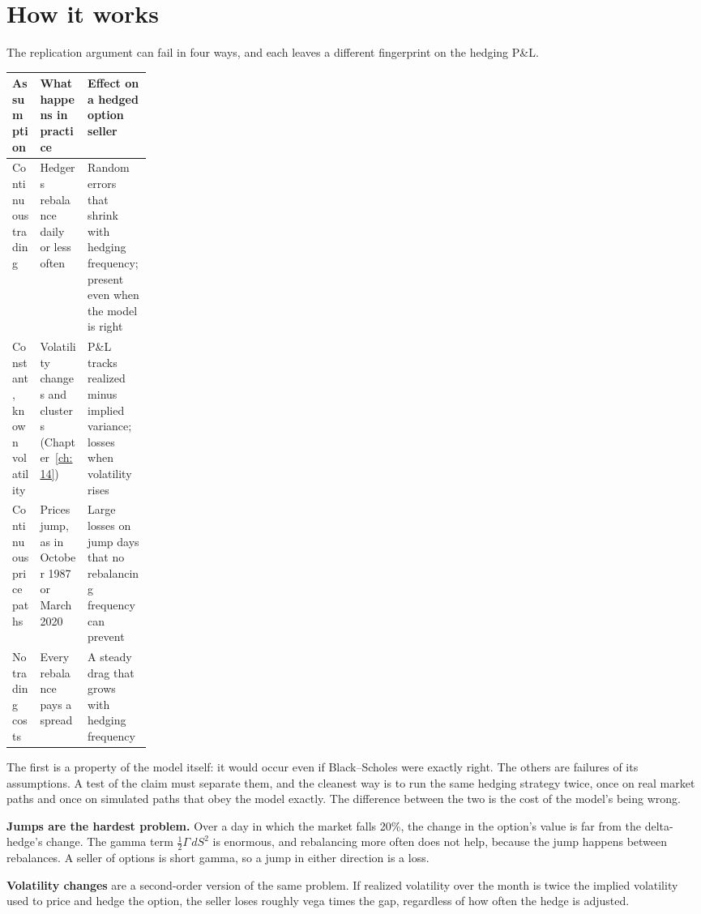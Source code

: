 \section{How it works}
\label{sec:17-how}

The replication argument can fail in four ways, and each leaves a different fingerprint on the hedging P\&L.

\begin{center}
\small
\begin{tabularx}{0.9\linewidth}{@{}>{\raggedright\arraybackslash}p{0.2\linewidth}>{\raggedright\arraybackslash}X>{\raggedright\arraybackslash}X@{}}
\toprule
Assumption & What happens in practice & Effect on a hedged option seller \\
\midrule
Continuous trading & Hedgers rebalance daily or less often & Random errors that shrink with hedging frequency; present even when the model is right \\
Constant, known volatility & Volatility changes and clusters (Chapter~\ref{ch:14}) & P\&L tracks realized minus implied variance; losses when volatility rises \\
Continuous price paths & Prices jump, as in October 1987 or March 2020 & Large losses on jump days that no rebalancing frequency can prevent \\
No trading costs & Every rebalance pays a spread & A steady drag that grows with hedging frequency \\
\bottomrule
\end{tabularx}
\end{center}

The first is a property of the model itself: it would occur even if Black--Scholes were exactly right. The others are failures of its assumptions. A test of the claim must separate them, and the cleanest way is to run the same hedging strategy twice, once on real market paths and once on simulated paths that obey the model exactly. The difference between the two is the cost of the model's being wrong.

\textbf{Jumps are the hardest problem.} Over a day in which the market falls 20\%, the change in the option's value is far from the delta-hedge's change. The gamma term $\tfrac{1}{2}\Gamma\,dS^2$ is enormous, and rebalancing more often does not help, because the jump happens between rebalances. A seller of options is short gamma, so a jump in either direction is a loss.

\textbf{Volatility changes} are a second-order version of the same problem. If realized volatility over the month is twice the implied volatility used to price and hedge the option, the seller loses roughly vega times the gap, regardless of how often the hedge is adjusted.

